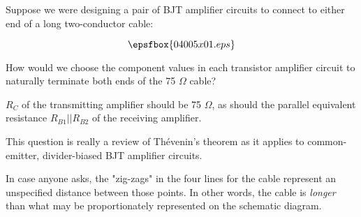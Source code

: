 

Suppose we were designing a pair of BJT amplifier circuits to connect to either end of a long two-conductor cable:

$$\epsfbox{04005x01.eps}$$

How would we choose the component values in each transistor amplifier circuit to naturally terminate both ends of the 75 $\Omega$ cable?







$R_C$ of the transmitting amplifier should be 75 $\Omega$, as should the parallel equivalent resistance $R_{B1} || R_{B2}$ of the receiving amplifier.







This question is really a review of Th\'evenin's theorem as it applies to common-emitter, divider-biased BJT amplifier circuits. 

In case anyone asks, the "zig-zags" in the four lines for the cable represent an unspecified distance between those points.  In other words, the cable is {\it longer} than what may be proportionately represented on the schematic diagram.




